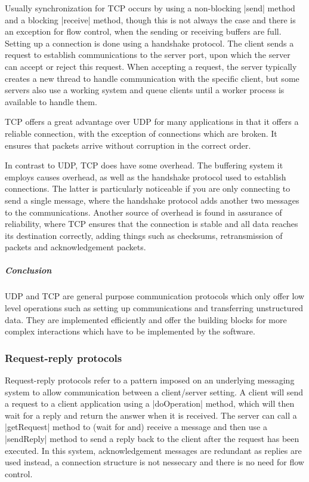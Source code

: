 \documentclass[a4paper]{article}
\begin{document}
Usually synchronization for TCP occurs by using a non-blocking |send| method and a blocking |receive| method, though this is not always the case and there is an exception for flow control, when the sending or receiving buffers are full. Setting up a connection is done using a handshake protocol. The client sends a request to establish communications to the server port, upon which the server can accept or reject this request. When accepting a request, the server typically creates a new thread to handle communication with the specific client, but some servers also use a working system and queue clients until a worker process is available to handle them.

TCP offers a great advantage over UDP for many applications in that it offers a reliable connection, with the exception of connections which are broken. It ensures that packets arrive without corruption in the correct order.

In contrast to UDP, TCP does have some overhead. The buffering system it employs causes overhead, as well as the handshake protocol used to establish connections. The latter is particularly noticeable if you are only connecting to send a single message, where the handshake protocol adds another two messages to the communications. Another source of overhead is found in assurance of reliability, where TCP ensures that the connection is stable and all data reaches its destination correctly, adding things such as checksums, retransmission of packets and acknowledgement packets.

\subparagraph*{Conclusion}

UDP and TCP are general purpose communication protocols which only offer low level operations such as setting up communications and transferring unstructured data. They are implemented efficiently and offer the building blocks for more complex interactions which have to be implemented by the software.

\subsubsection{Request-reply protocols}

Request-reply protocols refer to a pattern imposed on an underlying messaging system to allow communication between a client/server setting. A client will send a request to a client application using a |doOperation| method, which will then wait for a reply and return the answer when it is received. The server can call a |getRequest| method to (wait for and) receive a message and then use a |sendReply| method to send a reply back to the client after the request has been executed. In this system, acknowledgement messages are redundant as replies are used instead, a connection structure is not nessecary and there is no need for flow control.
\end{document}
